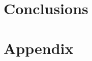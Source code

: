 \documentclass[ twoside,openright,titlepage, numbers=noenddot,%
                headinclude,footinclude,cleardoublepage=empty,abstract=on,
                BCOR=5mm,paper=a4,fontsize=11pt
                ]{scrreprt}
\begin{document}
\part{Conclusions}
\label{pt:End}


\appendix
\cleardoublepage
\part{Appendix}

\cleardoublepage
\cleardoublepage
\cleardoublepage
\cleardoublepage
\end{document}
